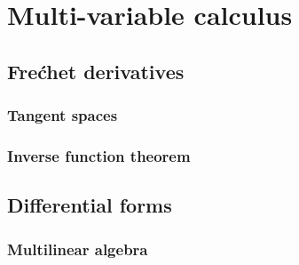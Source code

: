 \documentclass{../../large}
\begin{document}
\begin{prb}
\end{prb}













\part{Multi-variable calculus}
\chapter{Fre\'chet derivatives}
\section{Tangent spaces}
\begin{prb}

\end{prb}

\section{Inverse function theorem}






\chapter{Differential forms}
\section{Multilinear algebra}

\begin{prb}
\end{prb}

\begin{prb}
\end{prb}



\begin{prb}
\end{prb}
\end{document}
